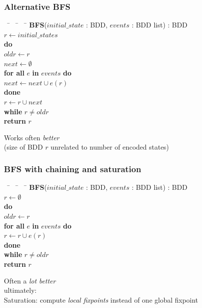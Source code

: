 \documentclass{beamer}
\begin{document}
\begin{frame}
  \frametitle{Alternative BFS}

  \begin{tabbing}
    $\;\;$ \= $\;\;$ \= $\;\;$ \= \kill
    \textbf{BFS}($initial\_state$ : BDD, $events$ : BDD list) : BDD\\
    \> $r \gets initial\_states$\\
    \> \textbf{do}\\
    \> \> $oldr \gets r$\\
    \> \> $next \gets \emptyset$\\
    \> \> \textbf{for all} $e$ \textbf{in} $events$ \textbf{do}\\
    \> \> \> $next \gets next \cup e(r)$\\
    \> \> \textbf{done}\\
    \> \> $r \gets r \cup next$\\
    \> \textbf{while} $r \neq oldr$\\
    \> \textbf{return} $r$
  \end{tabbing}

  Works often \emph{better}\\
  (size of BDD $r$ unrelated to number of encoded states)
\end{frame}

\begin{frame}
  \frametitle{BFS with chaining and saturation}

  \begin{tabbing}
    $\;\;$ \= $\;\;$ \= $\;\;$ \= \kill
    \textbf{BFS}($initial\_state$ : BDD, $events$ : BDD list) : BDD\\
    \> $r \gets \emptyset$\\
    \> \textbf{do}\\
    \> \> $oldr \gets r$\\
    \> \> \textbf{for all} $e$ \textbf{in} $events$ \textbf{do}\\
    \> \> \> $r \gets r \cup e(r)$\\
    \> \> \textbf{done}\\
    \> \textbf{while} $r \neq oldr$\\
    \> \textbf{return} $r$
  \end{tabbing}

  Often a \emph{lot better}\\
  \vspace{1em}
  ultimately:\\
  Saturation: compute \emph{local fixpoints} instead of one global fixpoint
\end{frame}
\end{document}
